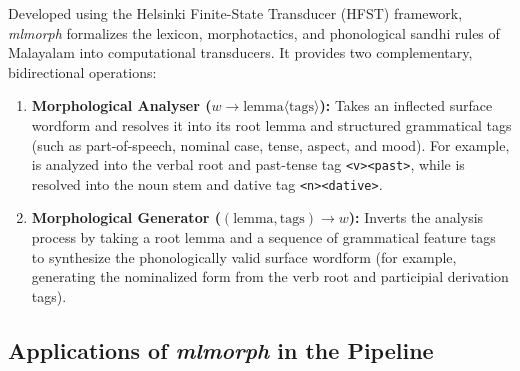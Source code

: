 Developed using the Helsinki Finite-State Transducer (HFST) framework, \textit{mlmorph} formalizes the lexicon, morphotactics, and phonological sandhi rules of Malayalam into computational transducers. It provides two complementary, bidirectional operations:
\begin{enumerate}[noitemsep]
    \item \textbf{Morphological Analyser ($w \longrightarrow \text{lemma}\langle\text{tags}\rangle$):} Takes an inflected surface wordform and resolves it into its root lemma and structured grammatical tags (such as part-of-speech, nominal case, tense, aspect, and mood). For example,  is analyzed into the verbal root  and past-tense tag \texttt{<v><past>}, while  is resolved into the noun stem  and dative tag \texttt{<n><dative>}.
    \item \textbf{Morphological Generator ($(\text{lemma}, \text{tags}) \longrightarrow w$):} Inverts the analysis process by taking a root lemma and a sequence of grammatical feature tags to synthesize the phonologically valid surface wordform (for example, generating the nominalized form  from the verb root and participial derivation tags).
\end{enumerate}

\subsection{Applications of \textit{mlmorph} in the Pipeline}

